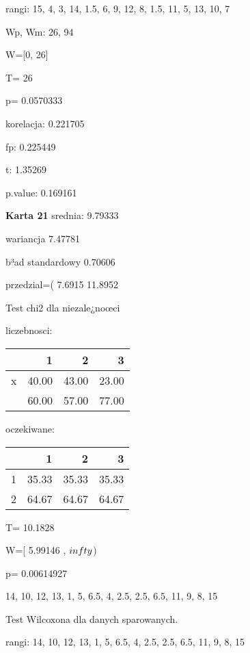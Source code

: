 \documentclass[a4paper,12pt]{article}
\begin{document}
\begin{multicols}{3}
  rangi: 15, 4, 3, 14, 1.5, 6, 9, 12, 8, 1.5, 11, 5, 13, 10, 7 
  
  Wp, Wm:  26,  94 
  
  W=[0, 26]  
  
  T=  26 
  
  p= 0.0570333 \vspace{1cm} 

  korelacja: 0.221705
     
     fp: 0.225449
     
     t: 1.35269
     
     p.value: 0.169161 \vspace{1cm} 

  \textbf{Karta  21 } 
 srednia: 9.79333 
     
     wariancja 7.47781  
     
     b³ad standardowy 0.70606 
     
     przedzial=( 7.6915 11.8952 \vspace{1cm} 

  Test chi2 dla niezale¿noœci 
   
   liczebnosci: %
\begin{tabular}{rrrr}
  \hline
 & 1 & 2 & 3 \\
  \hline
x & 40.00 & 43.00 & 23.00 \\
   & 60.00 & 57.00 & 77.00 \\
   \hline
\end{tabular}
 
   
   oczekiwane: %
\begin{tabular}{rrrr}
  \hline
 & 1 & 2 & 3 \\
  \hline
1 & 35.33 & 35.33 & 35.33 \\
  2 & 64.67 & 64.67 & 64.67 \\
   \hline
\end{tabular}
 
   
   T= 10.1828 
   
   W=[ 5.99146 , $\\infty$) 
   
   p= 0.00614927 \vspace{1cm} 

  14, 10, 12, 13, 1, 5, 6.5, 4, 2.5, 2.5, 6.5, 11, 9, 8, 15 

  Test Wilcoxona dla danych sparowanych. 
  
  rangi: 14, 10, 12, 13, 1, 5, 6.5, 4, 2.5, 2.5, 6.5, 11, 9, 8, 15 
  

\end{multicols}
\end{document}
